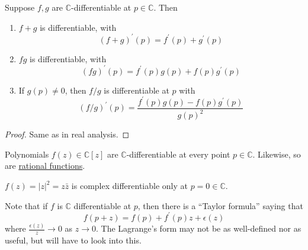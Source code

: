   \begin{theorem}
    \label{thm:algebraic-rules-for-c-differentiation}
    Suppose $f, g$ are $\mathbb{C}$-differentiable at $p \in \mathbb{C}$. Then 
    \begin{enumerate}
      \item $f + g$ is differentiable, with 
        \begin{equation}
          (f + g)^\prime (p) = f^\prime (p) + g^\prime (p)
        \end{equation}

      \item $fg$ is differentiable, with 
        \begin{equation}
          (fg)^\prime (p) = f^\prime (p) g(p) + f(p) g^\prime (p)
        \end{equation} 

      \item If $g(p) \neq 0$, then $f/g$ is differentiable at $p$ with 
        \begin{equation}
          (f/g)^\prime (p) = \frac{f^\prime (p) g (p) - f(p) g^\prime (p)}{g(p)^2}
        \end{equation}
    \end{enumerate}
  \end{theorem}
  \begin{proof}
    Same as in real analysis. 
  \end{proof}

  \begin{corollary}
    \label{thm:polynomials-and-rational-functions-are}
    Polynomials $f(z) \in \mathbb{C}[z]$ are $\mathbb{C}$-differentiable at every point $p \in \mathbb{C}$. Likewise, so are \hyperref[alg-def:rational-functions]{rational functions}. 
  \end{corollary}

  \begin{example}
    \label{ex:z2-is-differentiable-only-at-the-origin}
    $f(z) = |z|^2 = z \bar{z}$ is complex differentiable only at $p = 0 \in \mathbb{C}$. 
  \end{example}

  Note that if $f$ is $\mathbb{C}$ differentiable at $p$, then there is a ``Taylor formula'' saying that 
  \begin{equation}
    f(p + z) = f(p) + f^\prime (p) z + \epsilon (z)
  \end{equation}
  where $\frac{\epsilon(z)}{z} \to 0$ as $z \to 0$. The Lagrange's form may not be as well-defined nor as useful, but will have to look into this. 

